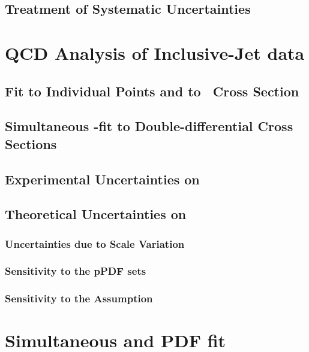 \subsection{Treatment of Systematic Uncertainties}
\label{subsec:sysunctreatment}


\section{QCD Analysis of Inclusive-Jet data}
\label{sec:asfit}
% 
% 

\subsection{Fit to Individual Points and to \dsdetjetb~Cross Section}
\label{subsec:singledifasfit}
% 
% 

\subsection{Simultaneous \asz-fit to Double-differential Cross Sections}
\label{subsec:doubledifasfit}

\subsection{Experimental Uncertainties on \asz}
\label{subsec:asexpunc}

\subsection{Theoretical Uncertainties on \asz}
\label{subsec:asthunc}
% 

\subsubsection{Uncertainties due to Scale Variation}
\label{subsec:asscalevar}

\subsubsection{Sensitivity to the pPDF sets}
\label{subsec:aspdfassump}

\subsubsection{Sensitivity to the \asz Assumption}
\label{subsec:asassump}

\section{Simultaneous \asz and PDF fit}
\label{sec:aspdffit}